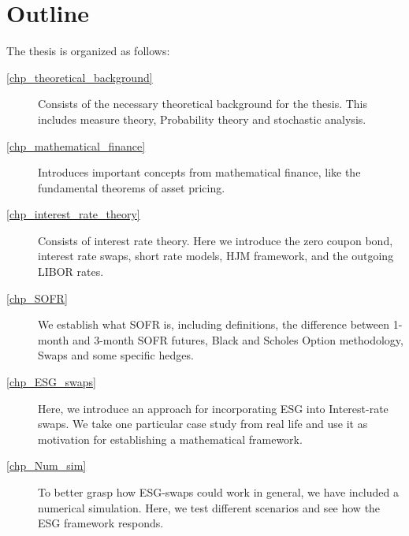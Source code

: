 \chapter{Outline}
\label{intro}
\begin{comment}
The rest of the text is organised as follows. This is an example of a description list; see more lists in \cref{discussion} and \vref{tab14}.    
\end{comment}

The thesis is organized as follows: 
\begin{description}
    \item[\cref{chp_theoretical_background}] Consists of the necessary theoretical background for the thesis. This includes measure theory, Probability theory and stochastic analysis. 

    \item[\cref{chp_mathematical_finance}] Introduces important concepts from mathematical finance, like the fundamental theorems of asset pricing. 

    \item[\cref{chp_interest_rate_theory}] Consists of interest rate theory. Here we introduce the zero coupon bond, interest rate swaps, short rate models, HJM framework, and the outgoing LIBOR rates.

    \item[\cref{chp_SOFR}] We establish what SOFR is, including definitions, the difference between 1-month and 3-month SOFR futures, Black and Scholes Option methodology, Swaps and some specific hedges.

    \item[\cref{chp_ESG_swaps}] Here, we introduce an approach for incorporating ESG into Interest-rate swaps. We take one particular case study from real life and use it as motivation for establishing a mathematical framework. 

    \item[\cref{chp_Num_sim}] To better grasp how ESG-swaps could work in general, we have included a numerical simulation. Here, we test different scenarios and see how the ESG framework responds.     


\end{description}
